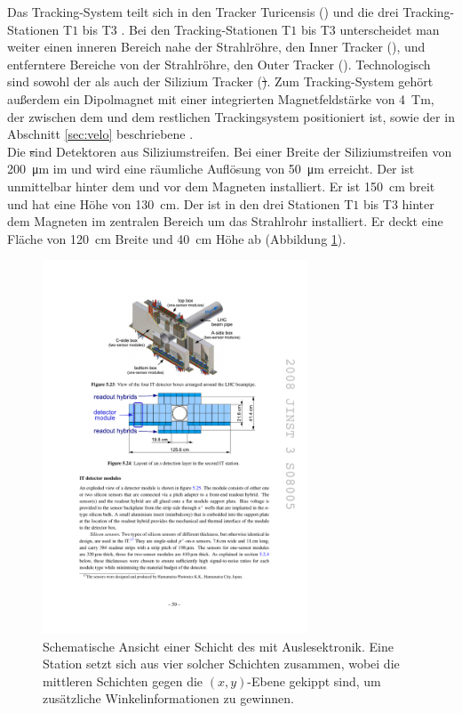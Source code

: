 Das Tracking-System teilt sich in den Tracker Turicensis (\ttracker) und die drei Tracking-Stationen T$1$ bis T$3$ . Bei den Tracking-Stationen T$1$ bis T$3$ unterscheidet man weiter einen inneren Bereich nahe der Strahlröhre, den Inner Tracker (\intr), und entferntere Bereiche von der Strahlröhre, den Outer Tracker (\ot). Technologisch sind sowohl der \ttracker als auch der \intr Silizium Tracker (\st). Zum Tracking-System gehört außerdem ein Dipolmagnet mit einer integrierten Magnetfeldstärke von \SI{4}{Tm}, der zwischen dem \ttracker und dem restlichen Trackingsystem positioniert ist, sowie der in Abschnitt \ref{sec:velo} beschriebene \velo.\\
Die \st sind Detektoren aus Siliziumstreifen. Bei einer Breite der Siliziumstreifen von \SI{200}{\micro m} im \intr und \ttracker wird eine räumliche Auflösung von \SI{50}{\micro m} erreicht. Der \ttracker ist unmittelbar hinter dem \richone und vor dem Magneten installiert. Er ist \SI{150}{cm} breit und hat eine Höhe von \SI{130}{cm}. Der \intr ist in den drei Stationen  T$1$ bis T$3$ hinter dem Magneten im zentralen Bereich um das Strahlrohr installiert. Er deckt eine Fläche von \SI{120}{cm} Breite und \SI{40}{cm} Höhe ab (Abbildung \ref{fig:it}). 
\begin{figure}[htpb]
	\centering
		\includegraphics[width=0.7\textwidth]{fig/IT.pdf}
	\caption{Schematische Ansicht einer Schicht des \intr mit Auslesektronik. Eine Station setzt sich aus vier solcher Schichten zusammen, wobei die mittleren Schichten gegen die $(x,y)$-Ebene gekippt sind, um zusätzliche Winkelinformationen zu gewinnen. \cite{Alves:2008zz}}
	\label{fig:it} 
\end{figure}\\
